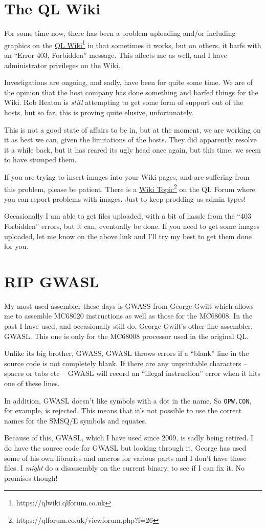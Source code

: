 \section{The QL Wiki}

For some time now, there has been a problem uploading and/or including
graphics on the \href{https://qlwiki.qlforum.co.uk/}{QL Wiki}\footnote{https://qlwiki.qlforum.co.uk}
in that sometimes it works, but on others, it barfs with an ``Error
403, Forbidden'' message. This affects me as well, and I have administrator
privileges on the Wiki.

Investigations are ongoing, and sadly, have been for quite some time.
We are of the opinion that the host company has done something and
barfed things for the Wiki. Rob Heaton is \emph{still} attempting
to get some form of support out of the hosts, but so far, this is
proving quite elusive, unfortunately.

This is not a good state of affairs to be in, but at the moment, we
are working on it as best we can, given the limitations of the hosts.
They did apparently resolve it a while back, but it has reared its
ugly head once again, but this time, we seem to have stumped them.

If you are trying to insert images into your Wiki pages, and are suffering
from this problem, please be patient. There is a \href{https://qlforum.co.uk/viewforum.php?f=26}{Wiki Topic}\footnote{https://qlforum.co.uk/viewforum.php?f=26}
on the QL Forum where you can report problems with images. Just to
keep prodding us admin types!

Occasionally I am able to get files uploaded, with a bit of hassle
from the ``403 Forbidden'' errors, but it can, eventually be done.
If you need to get some images uploaded, let me know on the above
link and I'll try my best to get them done for you.

\section{RIP GWASL}

My most used assembler these days is GWASS from George Gwilt which
allows me to assemble MC68020 instructions as well as those for the
MC68008. In the past I have used, and occasionally still do, George
Gwilt's other fine assembler, GWASL. This one is only for the MC68008
processor used in the original QL. 

Unlike its big brother, GWASS, GWASL throws errors if a ``blank''
line in the source code is not completely blank. If there are any
unprintable characters -- spaces or tabs etc -- GWASL will record
an ``illegal instruction'' error when it hits one of these lines.

In addition, GWASL doesn't like symbols with a dot in the name. So
\texttt{OPW.CON}, for example, is rejected. This means that it's not
possible to use the correct names for the SMSQ/E symbols and equates.

Because of this, GWASL, which I have used since 2009, is sadly being
retired. I do have the source code for GWASL but looking through it,
George has used some of his own libraries and macros for various parts
and I don't have those files. I \emph{might} do a disassembly on the
current binary, to see if I can fix it. No promises though!
